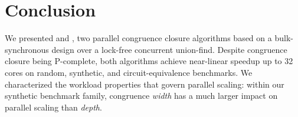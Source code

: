 \section{Conclusion}
\label{sec:conclusion}

We presented \parentalgo and \filteralgo, two parallel congruence closure
algorithms based on a bulk-synchronous design over a lock-free concurrent
union-find. Despite congruence closure being \textsc{P}-complete, both
algorithms achieve near-linear speedup up to 32 cores on random, synthetic,
and circuit-equivalence benchmarks. We characterized the workload properties
that govern parallel scaling: within our synthetic benchmark family, congruence 
\emph{width} has a much larger impact on parallel scaling than \emph{depth}.
